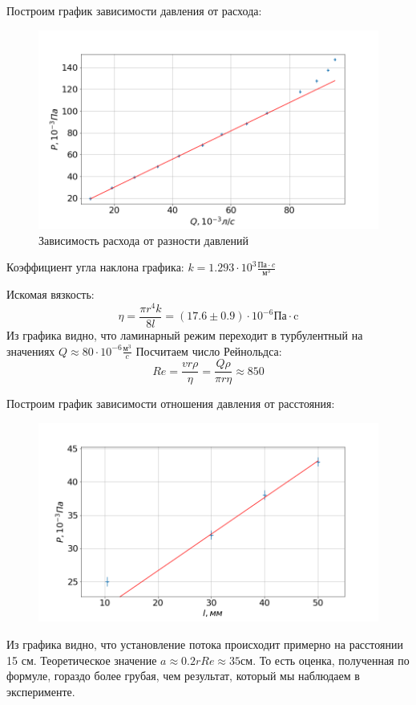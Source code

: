 \documentclass[a4paper, fontsize=14pt]{article}
\begin{document}
Построим график зависимости давления от расхода:
\begin{figure}[H]
\center
\includegraphics[scale=0.39]{PQ.png}
\caption{Зависимость расхода от разности давлений}
\end{figure}

Коэффициент угла наклона графика: $k = 1.293 \cdot 10^{3} \frac{\text{Па} \cdot c}{\text{м}^3}$

Искомая вязкость:
\[
	\eta = \frac{\pi r^4 k}{8 l} = (17.6 \pm 0.9) \cdot 10^{-6} \text{Па} \cdot \text{c}
\]
Из графика видно, что ламинарный режим переходит в турбулентный на значениях $Q \approx 80 \cdot 10^{-6} \frac{\text{м}^3}{c}$
Посчитаем число Рейнольдса:
\[
	Re = \frac{vr\rho}{\eta} = 	\frac{Q \rho}{\pi r \eta} \approx  850
\]

Построим график зависимости отношения давления от расстояния:
\begin{figure}[H]
\center
\includegraphics[scale=0.4]{Pl.png}
\end{figure}
Из графика видно, что установление потока происходит примерно на расстоянии 15 см. Теоретическое значение $a \approx 0.2 r Re \approx 35 \text{см}$. То есть оценка, полученная по формуле, гораздо более грубая, чем результат, который мы наблюдаем в эксперименте.
\end{document}
